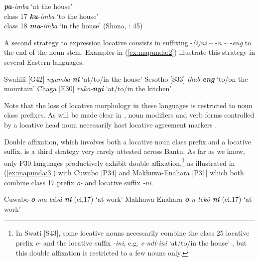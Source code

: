 \documentclass[output=paper ]{langscibook}
\begin{document}
\ea 
\label{ex:mapunda:1}
    \textbf{\textit{pa}}\textit{{}-imba}   {‘at the house’}\\
  {class 17}        \textbf{\textit{ku}}\textit{{}-imba} {‘to the house’}\\      
  {class 18}  \textbf{\textit{mu}}\textit{{}-imba}   {‘in the house’} \hfill (Shona, \citealt{NgungaMpofu2013}: 45)\\
  \z

A second strategy to expression locative consists in suffixing -\textit{(i)ni} {\textasciitilde} -\textit{n} {\textasciitilde} -\textit{eng} to the end of the noun stem. Examples in (\ref{ex:mapunda:2}) illustrate this strategy in several Eastern languages.


\ea 
\label{ex:mapunda:2}
    \ea\label{ex:mapunda:2a} Swahili [G42] \textit{nyumba-}\textbf{\textit{ni}}  ‘at/to/in the house’
    \ex\label{ex:mapunda:2b} Sesotho [S33]  \textit{thab-}\textbf{\textit{eng}   }‘to/on the mountain’ \hfill \citep[120]{Machobane1995}
    \ex\label{ex:mapunda:2c} Chaga [E30]  \textit{ruko-}\textbf{\textit{nyi}   }‘at/to/in the kitchen’ \hfill \citep[131]{Moshi1995}
    \z
\z

Note that the loss of locative morphology in these languages is restricted to noun class prefixes. As will be made clear in , noun modifiers and verb forms controlled by a locative head noun necessarily host locative agreement markers \citep{Mpiranya2015}.

Double affixation, which involves both a locative noun class prefix and a locative suffix, is a third strategy very rarely attested across Bantu. As far as we know, only P30 languages productively exhibit double affixation,\footnote{{In Swati [S43], some locative nouns necessarily combine the class 25 locative prefix} {\textit{e}}{{}- and the locative suffix} {\textit{{}-ini}}{, e.g.} {\textit{e-ndl-ini}} {‘at/to/in the house’ \citep[254]{Marten2010}, but this double affixation is restricted to a few nouns only.}} as illustrated in (\ref{ex:mapunda:3}) with Cuwabo [P34] and Makhuwa-Enahara [P31] which both combine class 17 prefix \textit{o-} and locative suffix \textit{{}-ni}.


\ea
\label{ex:mapunda:3}
    \ea\label{ex:mapunda:3a} Cuwabo  \textbf{\textit{o}}\textit{{}-ma-básá-}\textbf{\textit{ni}}  (cl.17)  ‘at work’
    \ex\label{ex:mapunda:3b} Makhuwa-Enahara  \textbf{\textit{o}}\textit{{}-n-tékô-}\textbf{\textit{ni} }(cl.17)  ‘at work’ \hfill \citep[51]{Guérois2016}
    \z
\z
\end{document}
